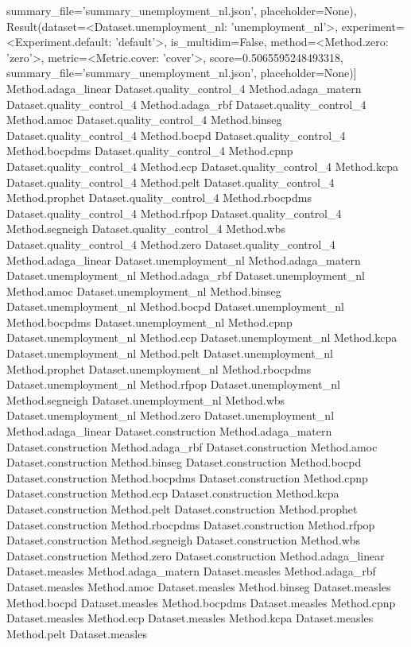 summary_file='summary_unemployment_nl.json', placeholder=None), Result(dataset=<Dataset.unemployment_nl: 'unemployment_nl'>, experiment=<Experiment.default: 'default'>, is_multidim=False, method=<Method.zero: 'zero'>, metric=<Metric.cover: 'cover'>, score=0.5065595248493318, summary_file='summary_unemployment_nl.json', placeholder=None)]
Method.adaga_linear Dataset.quality_control_4
Method.adaga_matern Dataset.quality_control_4
Method.adaga_rbf Dataset.quality_control_4
Method.amoc Dataset.quality_control_4
Method.binseg Dataset.quality_control_4
Method.bocpd Dataset.quality_control_4
Method.bocpdms Dataset.quality_control_4
Method.cpnp Dataset.quality_control_4
Method.ecp Dataset.quality_control_4
Method.kcpa Dataset.quality_control_4
Method.pelt Dataset.quality_control_4
Method.prophet Dataset.quality_control_4
Method.rbocpdms Dataset.quality_control_4
Method.rfpop Dataset.quality_control_4
Method.segneigh Dataset.quality_control_4
Method.wbs Dataset.quality_control_4
Method.zero Dataset.quality_control_4
Method.adaga_linear Dataset.unemployment_nl
Method.adaga_matern Dataset.unemployment_nl
Method.adaga_rbf Dataset.unemployment_nl
Method.amoc Dataset.unemployment_nl
Method.binseg Dataset.unemployment_nl
Method.bocpd Dataset.unemployment_nl
Method.bocpdms Dataset.unemployment_nl
Method.cpnp Dataset.unemployment_nl
Method.ecp Dataset.unemployment_nl
Method.kcpa Dataset.unemployment_nl
Method.pelt Dataset.unemployment_nl
Method.prophet Dataset.unemployment_nl
Method.rbocpdms Dataset.unemployment_nl
Method.rfpop Dataset.unemployment_nl
Method.segneigh Dataset.unemployment_nl
Method.wbs Dataset.unemployment_nl
Method.zero Dataset.unemployment_nl
Method.adaga_linear Dataset.construction
Method.adaga_matern Dataset.construction
Method.adaga_rbf Dataset.construction
Method.amoc Dataset.construction
Method.binseg Dataset.construction
Method.bocpd Dataset.construction
Method.bocpdms Dataset.construction
Method.cpnp Dataset.construction
Method.ecp Dataset.construction
Method.kcpa Dataset.construction
Method.pelt Dataset.construction
Method.prophet Dataset.construction
Method.rbocpdms Dataset.construction
Method.rfpop Dataset.construction
Method.segneigh Dataset.construction
Method.wbs Dataset.construction
Method.zero Dataset.construction
Method.adaga_linear Dataset.measles
Method.adaga_matern Dataset.measles
Method.adaga_rbf Dataset.measles
Method.amoc Dataset.measles
Method.binseg Dataset.measles
Method.bocpd Dataset.measles
Method.bocpdms Dataset.measles
Method.cpnp Dataset.measles
Method.ecp Dataset.measles
Method.kcpa Dataset.measles
Method.pelt Dataset.measles
